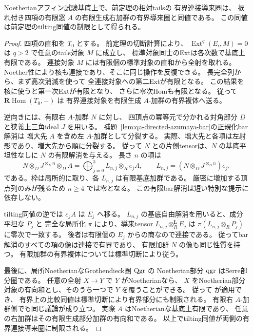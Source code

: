 \begin{corollary}[特異基底を含む有界連接Morita比較]
\label{cor:qa-avatar-relative-bounded-coherent-morita}
Noetherianアフィン試験基底上で、前定理の相対tailsの
有界連接導来圏は、
捩れ付き四項の有限窓 $A$ の有限生成右加群の有界導来圏と同値である。
この同値は前定理のtilting同値の制限として得られる。
\end{corollary}
\begin{proof}
四項の直和を $T_0$ とする。
前定理の切断計算により、
$\operatorname{Ext}^q(E_i,M)=0$ は $q>2$ で任意のtails対象 $M$ に成立し、
標準対象同士のExtは各次数で基底上有限である。
連接対象 $M$ には有限個の標準対象の直和から全射を取れる。
Noether性により核も連接であり、そこに同じ操作を反復できる。
長完全列から、まず高次消滅を使って
全連接対象への第二Extが有限となる。
この結果を核に使うと第一次Extが有限となり、
さらに零次Homも有限となる。
従って $\mathbf R\operatorname{Hom}(T_0,-)$ は
有界連接対象を有限生成 $A$-加群の有界複体へ送る。

逆向きには、有限右 $A$-加群 $N$ に対し、
四頂点の冪等元で分かれる対角部分 $D$ と狭義上三角ideal $J$ を用いる。
補題~\ref{lem:qa-directed-azumaya-bar}の正規化bar解消は
増大先 $A$ を含め左 $A$-加群として分裂する。
実際、増大先と各項は左射影であり、増大先から順に分裂する。
従って $N$ との片側tensorは、$N$ の基底平坦性なしに
$N$ の有限解消を与える。
長さ $n$ の項は
\[
 N\otimes_D J^{\otimes_D n}\otimes_D A
    =\bigoplus_{j=0}^{3} L_{n,j}\otimes_R e_j A,
 \qquad
 L_{n,j}=(N\otimes_D J^{\otimes_D n})e_j ,
\]
である。枠は局所的に取り、各 $L_{n,j}$ は有限基底加群である。
厳密に増加する頂点列のみが残るため $n\ge 4$ では零となる。
この有限bar解消は短い特別な提示に依存しない。

tilting同値の逆では $e_jA$ は $E_j$ へ移る。
$L_{n,j}$ の基底自由解消を用いると、成分平坦な $P_j$ と
完全な局所化 $\pi$ により、導来tensor
$L_{n,j}\otimes_R^{\mathbf L}E_j$ は
$\pi(L_{n,j}\otimes_R P_j)$ に零次で一致する。
後者は有限個の $E_j$ からの商なので連接である。
従ってbar解消のすべての項の像は連接で有界であり、
有限加群 $N$ の像も同じ性質を持つ。
有限加群の有界複体については標準切断により従う。

最後に、局所NoetherianなGrothendieck圏 $\operatorname{Qgr}$ の
Noetherian部分 $\operatorname{qgr}$ はSerre部分圏である。
任意の全射 $X\to Y$ で $Y$ がNoetherianなら、
$X$ をNoetherian部分対象の有向和とし、そのうち一つで
$Y$ を覆うことができる。
従って \cite[Tag 0FCL, Lemma 13.17.4]{StacksModuli} が適用でき、
有界上の比較同値は標準切断により有界部分にも制限される。
有限右 $A$-加群側でも同じ議論が成り立つ。
実際 $A$ はNoetherianな基底上有限であり、
任意の右加群はその有限生成部分加群の有向和である。
以上でtilting同値が両側の有界連接導来圏に制限される。
\end{proof}

